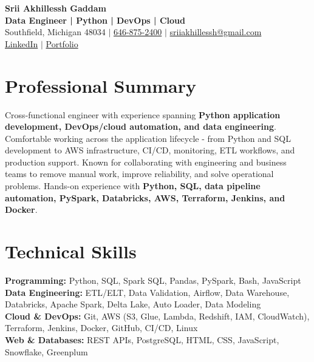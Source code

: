 \documentclass[letterpaper,10pt]{article}
\begin{document}
\fontsize{9.35pt}{10.45pt}\selectfont

\begin{center}
    {\LARGE \textbf{Srii Akhillessh Gaddam}} \\[-1pt]
    \textbf{Data Engineer | Python | DevOps | Cloud} \\[2pt]
    Southfield, Michigan 48034 $|$
    \href{tel:6468752400}{646-875-2400} $|$
    \href{mailto:sriiakhillessh@gmail.com}{sriiakhillessh@gmail.com} \\[1pt]
    \href{https://www.linkedin.com/in/srii-akhiilessh-gaddam-b48668191/}{LinkedIn} $|$
    \href{https://sriiakhillesshg.github.io/portfolio/}{Portfolio}
\end{center}
\vspace{-8pt}

\section{Professional Summary}
\small{Cross-functional engineer with experience spanning \textbf{Python application development, DevOps/cloud automation, and data engineering}. Comfortable working across the application lifecycle - from Python and SQL development to AWS infrastructure, CI/CD, monitoring, ETL workflows, and production support. Known for collaborating with engineering and business teams to remove manual work, improve reliability, and solve operational problems. Hands-on experience with \textbf{Python, SQL, data pipeline automation, PySpark, Databricks, AWS, Terraform, Jenkins, and Docker}.}

\section{Technical Skills}
\small{
\textbf{Programming:} Python, SQL, Spark SQL, Pandas, PySpark, Bash, JavaScript \\
\textbf{Data Engineering:} ETL/ELT, Data Validation, Airflow, Data Warehouse, Databricks, Apache Spark, Delta Lake, Auto Loader, Data Modeling \\
\textbf{Cloud \& DevOps:} Git, AWS (S3, Glue, Lambda, Redshift, IAM, CloudWatch), Terraform, Jenkins, Docker, GitHub, CI/CD, Linux \\
\textbf{Web \& Databases:} REST APIs, PostgreSQL, HTML, CSS, JavaScript, Snowflake, Greenplum
}
\end{document}

